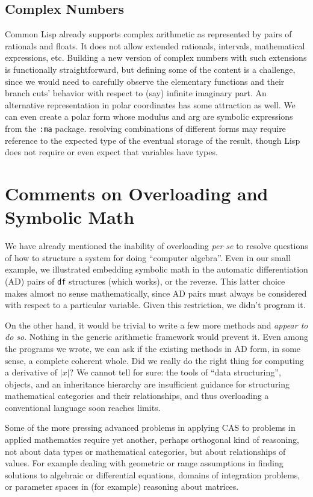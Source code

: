\documentclass{article}
\begin{document}
{{\subsection*{Complex Numbers}
Common Lisp already supports complex arithmetic as represented by
pairs of rationals and floats. It does not allow extended rationals,
intervals, mathematical expressions, etc.  Building a new version of
complex numbers with such extensions is functionally straightforward,
but defining some of the content is a challenge, since we would need
to carefully observe the elementary functions and their branch cuts'
behavior with respect to (say) infinite imaginary part. An alternative
representation in polar coordinates has some attraction as well.  We
can even create a polar form whose modulus and arg are symbolic
expressions from the {\tt :ma} package.  resolving combinations of
different forms may require reference to the expected type of the
eventual storage of the result, though Lisp does not require or even
expect that variables have types.  } {\section {Comments on
Overloading and Symbolic Math} We have already mentioned the inability
of overloading {\em per se} to resolve questions of how to structure a
system for doing ``computer algebra''.  Even in our small example, we
illustrated embedding symbolic math in the automatic differentiation
(AD) pairs of {\tt df} structures (which works), or the reverse. This
latter choice makes almost no sense mathematically, since AD pairs
must always be considered with respect to a particular variable.
Given this restriction, we didn't program it. 

On the other hand, it would be trivial to write a
few more methods and {\em appear to do so}. Nothing in the generic
arithmetic framework would prevent it.  Even among the programs we
wrote, we can ask if the existing methods in AD form, in some sense, a
complete coherent whole. Did we really do the right thing for computing
a derivative of $|x|$?
We cannot tell for sure: the tools of ``data structuring'', objects,
and an inheritance hierarchy are insufficient guidance for structuring
mathematical categories and their relationships, and thus overloading
a conventional language soon reaches limits.

Some of the more pressing advanced problems in applying CAS to
problems in applied mathematics require yet another, perhaps
orthogonal kind of reasoning, not about data types or mathematical
categories, but about relationships of values.  For example dealing
with geometric or range assumptions in finding solutions to algebraic
or differential equations, domains of integration problems, or
parameter spaces in (for example) reasoning about matrices.

}}
\end{document}
